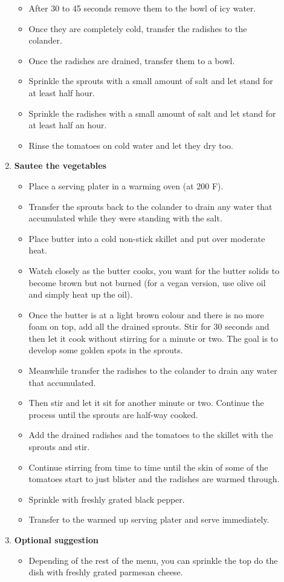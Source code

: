\documentclass[11pt,letterpaper]{article}
\begin{document}
\begin{description}
\begin{enumerate}
\begin{itemize}
	\item After 30 to 45 seconds remove them to the bowl of icy water.
	\item Once they are completely cold, transfer the radishes to the colander.
	\item Once the radishes are drained, transfer them to a bowl.
	\item Sprinkle the sprouts with a small amount of salt and let stand for at least half hour.
	\item Sprinkle the radishes with a small amount of salt and let stand for at least half an hour.
	\item Rinse the tomatoes on cold water and let they dry too.
	\end{itemize}
	\item {\bf Sautee the vegetables}
	\begin{itemize}
	\item Place a serving plater in a warming oven (at 200 F).
	\item Transfer the sprouts back to the colander to drain any water that accumulated while they were standing with the salt.
	\item Place butter into a cold non-stick skillet and put over moderate heat.
	\item Watch closely as the butter cooks, you want for the butter solids to become brown but not burned (for a vegan version, use olive oil and simply heat up the oil).
	\item Once the butter is at a light brown colour and there is no more foam on top, add all the drained sprouts. Stir for 30 seconds and then let it cook without stirring for a minute or two. The goal is to develop some golden spots in the sprouts. 
	\item Meanwhile transfer the radishes to the colander to drain any water that accumulated.
	\item Then stir and let it sit for another minute or two. Continue the process until the sprouts are half-way cooked.
	\item Add the drained radishes and the tomatoes to the skillet with the sprouts and stir.
	\item Continue stirring from time to time until the skin of some of the tomatoes start to just blister and the radishes are warmed through.
	\item Sprinkle with freshly grated black pepper.
	\item Transfer to the warmed up serving plater and serve immediately.
	\end{itemize}
	\item {\bf Optional suggestion}
	\begin{itemize}
	\item Depending of the rest of the menu, you can sprinkle the top do the dish with freshly grated parmesan cheese.
	\end{itemize}
	\end{enumerate}
\end{description}
\end{document}
